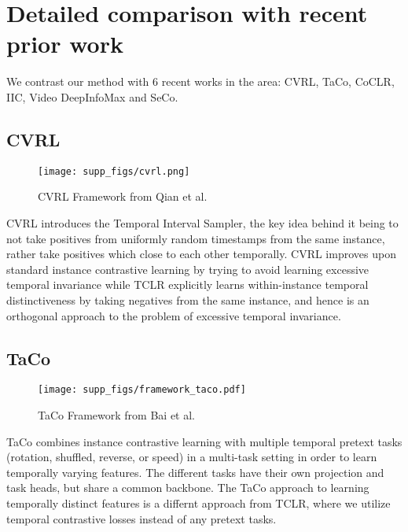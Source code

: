 \documentclass[10pt,twocolumn,letterpaper]{article}
\begin{document}
\clearpage
\clearpage

\section{Detailed comparison with recent prior work}
\label{sec:detailed_comparison}

We contrast our method with 6 recent works in the area: CVRL, TaCo, CoCLR, IIC,  Video DeepInfoMax and SeCo.

\subsection{CVRL~\cite{cvrl}}

\begin{figure}[h]
\begin{center}
 \texttt{[image: supp\_figs/cvrl.png]}
\end{center}
\vspace{-5mm}
  \caption{CVRL Framework from Qian et al.~\cite{cvrl}}
\label{fig:cvrl}
\end{figure}

CVRL introduces the Temporal Interval Sampler, the key idea behind it being to not take positives from uniformly random timestamps from the same instance, rather take positives which close to each other temporally. CVRL improves upon standard instance contrastive learning by trying to avoid learning excessive temporal invariance while TCLR explicitly learns within-instance temporal distinctiveness by taking negatives from the same instance, and hence is an orthogonal approach to the problem of excessive temporal invariance. 

\subsection{TaCo~\cite{taco}}

\begin{figure}[h]
\begin{center}
 \texttt{[image: supp\_figs/framework\_taco.pdf]}
\end{center}
\vspace{-5mm}
   \caption{TaCo Framework from Bai et al.~\cite{taco}}
\label{fig:taco}
\end{figure}

TaCo combines instance contrastive learning with multiple temporal pretext tasks (rotation, shuffled, reverse, or speed) in a multi-task setting in order to learn temporally varying features. The different tasks have their own projection and task heads, but share a common backbone. The TaCo approach to learning temporally distinct features is a differnt approach from TCLR, where we utilize temporal contrastive losses instead of any pretext tasks.
\end{document}
